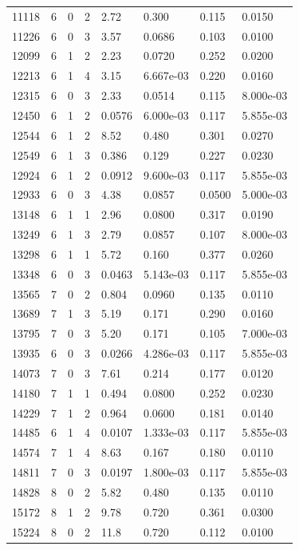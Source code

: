 \documentclass[preview]{standalone}
\begin{document}
{{{\begin{tabular}{L{1.2cm}C{1.2cm} C{0.3cm}C{0.5cm} C{1.4cm}C{1.4cm} C{1.4cm}C{1.4cm}}
  11118  &     6  & 0     &  2 &  2.72  & 0.300  & 0.115 &  0.0150   \\ 
  11226  &     6  & 0     &  3 &  3.57  & 0.0686  & 0.103 &  0.0100   \\ 
  12099  &     6  & 1     &  2 &  2.23  & 0.0720  & 0.252 &  0.0200   \\ 
  12213  &     6  & 1     &  4 &  3.15  & 6.667e-03  & 0.220 &  0.0160   \\ 
  12315  &     6  & 0     &  3 &  2.33  & 0.0514  & 0.115 &  8.000e-03   \\ 
  12450  &     6  & 1     &  2 &  0.0576  & 6.000e-03  & 0.117 &  5.855e-03   \\ 
  12544  &     6  & 1     &  2 &  8.52  & 0.480  & 0.301 &  0.0270   \\ 
  12549  &     6  & 1     &  3 &  0.386  & 0.129  & 0.227 &  0.0230   \\ 
  12924  &     6  & 1     &  2 &  0.0912  & 9.600e-03  & 0.117 &  5.855e-03   \\ 
  12933  &     6  & 0     &  3 &  4.38  & 0.0857  & 0.0500 &  5.000e-03   \\ 
  13148  &     6  & 1     &  1 &  2.96  & 0.0800  & 0.317 &  0.0190   \\ 
  13249  &     6  & 1     &  3 &  2.79  & 0.0857  & 0.107 &  8.000e-03   \\ 
  13298  &     6  & 1     &  1 &  5.72  & 0.160  & 0.377 &  0.0260   \\ 
  13348  &     6  & 0     &  3 &  0.0463  & 5.143e-03  & 0.117 &  5.855e-03   \\ 
  13565  &     7  & 0     &  2 &  0.804  & 0.0960  & 0.135 &  0.0110   \\ 
  13689  &     7  & 1     &  3 &  5.19  & 0.171  & 0.290 &  0.0160   \\ 
  13795  &     7  & 0     &  3 &  5.20  & 0.171  & 0.105 &  7.000e-03   \\ 
  13935  &     6  & 0     &  3 &  0.0266  & 4.286e-03  & 0.117 &  5.855e-03   \\ 
  14073  &     7  & 0     &  3 &  7.61  & 0.214  & 0.177 &  0.0120   \\ 
  14180  &     7  & 1     &  1 &  0.494  & 0.0800  & 0.252 &  0.0230   \\ 
  14229  &     7  & 1     &  2 &  0.964  & 0.0600  & 0.181 &  0.0140   \\ 
  14485  &     6  & 1     &  4 &  0.0107  & 1.333e-03  & 0.117 &  5.855e-03   \\ 
  14574  &     7  & 1     &  4 &  8.63  & 0.167  & 0.180 &  0.0110   \\ 
  14811  &     7  & 0     &  3 &  0.0197  & 1.800e-03  & 0.117 &  5.855e-03   \\ 
  14828  &     8  & 0     &  2 &  5.82  & 0.480  & 0.135 &  0.0110   \\ 
  15172  &     8  & 1     &  2 &  9.78  & 0.720  & 0.361 &  0.0300   \\ 
  15224  &     8  & 0     &  2 &  11.8  & 0.720  & 0.112 &  0.0100   \\ 
\hline 
\end{tabular} 

}}}
\end{document}
